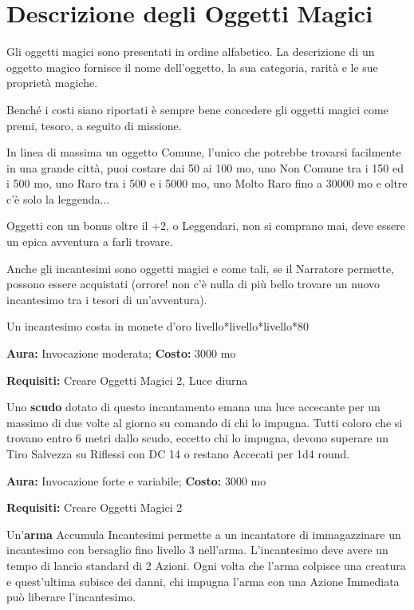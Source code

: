 \section{Descrizione degli Oggetti Magici}

\begin{multicols}{2}

Gli oggetti magici sono presentati in ordine alfabetico. La descrizione di un oggetto magico fornisce il nome dell'oggetto, la sua categoria, rarità e le sue proprietà magiche.

Benché i costi siano riportati è sempre bene concedere gli oggetti magici come premi, tesoro, a seguito di missione.

In linea di massima un oggetto Comune, l'unico che potrebbe trovarsi facilmente in una grande città, puoi costare dai 50 ai 100 mo, uno Non Comune tra i 150 ed i 500 mo, uno Raro tra i 500 e i 5000 mo, uno Molto Raro fino a 30000 mo e oltre c'è solo la leggenda...

Oggetti con un bonus oltre il +2, o Leggendari, non si comprano mai, deve essere un epica avventura a farli trovare.

\medskip

Anche gli incantesimi sono oggetti magici e come tali, se il Narratore permette, possono essere acquistati (orrore! non c'è nulla di più bello trovare un nuovo incantesimo tra i tesori di un'avventura).

Un incantesimo costa in monete d'oro livello*livello*livello*80

\medskip


\textbf{Aura:} Invocazione moderata; \textbf{Costo:} 3000 mo

\textbf{Requisiti:} Creare Oggetti Magici 2, Luce diurna

Uno \textbf{scudo} dotato di questo incantamento emana una luce accecante per un massimo di due volte al giorno su comando di chi lo impugna. Tutti coloro che si trovano entro 6 metri dallo scudo, eccetto chi lo impugna, devono superare un Tiro Salvezza su Riflessi con DC 14 o restano Accecati per 1d4 round.


\textbf{Aura:} Invocazione forte e variabile; \textbf{Costo:} 3000 mo

\textbf{Requisiti:} Creare Oggetti Magici 2

Un'\textbf{arma} Accumula Incantesimi permette a un incantatore di immagazzinare un incantesimo con bersaglio fino livello 3 nell'arma. L'incantesimo deve avere un tempo di lancio standard di 2 Azioni. Ogni volta che l'arma colpisce una creatura e quest'ultima subisce dei danni, chi impugna l'arma con una Azione Immediata può liberare l'incantesimo.


\end{multicols}
